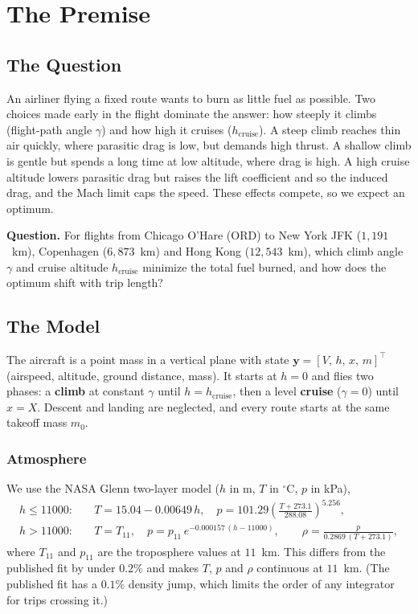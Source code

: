 
\section{The Premise}

\subsection{The Question}
An airliner flying a fixed route wants to burn as little fuel as possible. Two choices made
early in the flight dominate the answer: how steeply it climbs (flight-path angle $\gamma$)
and how high it cruises ($h_{\text{cruise}}$). A steep climb reaches thin air quickly, where
parasitic drag is low, but demands high thrust. A shallow climb is gentle but spends a long time
at low altitude, where drag is high. A high cruise altitude lowers parasitic drag but raises the
lift coefficient and so the induced drag, and the Mach limit caps the speed. These effects compete, so we
expect an optimum.

\textbf{Question.} For flights from Chicago O'Hare (ORD) to New York JFK ($1{,}191$~km),
Copenhagen ($6{,}873$~km) and Hong Kong ($12{,}543$~km), which climb angle $\gamma$ and cruise
altitude $h_{\text{cruise}}$ minimize the total fuel burned, and how does the optimum shift with
trip length?

\subsection{The Model}
The aircraft is a point mass in a vertical plane with state $\mathbf{y}=[V,\,h,\,x,\,m]^\top$
(airspeed, altitude, ground distance, mass). It starts at $h=0$ and flies two phases:
a \textbf{climb} at constant $\gamma$ until $h=h_{\text{cruise}}$, then a level \textbf{cruise}
($\gamma=0$) until $x=X$. Descent and landing are neglected, and every route starts at the same takeoff
mass $m_0$.

\subsubsection{Atmosphere}
We use the NASA Glenn two-layer model ($h$ in m, $T$ in $^\circ$C, $p$ in kPa),
\begin{align}
  h \le 11000: \quad & T = 15.04 - 0.00649\,h, \quad
     p = 101.29\left(\tfrac{T+273.1}{288.08}\right)^{5.256}, \\
  h > 11000: \quad & T = T_{11},\quad p = p_{11}\,e^{-0.000157\,(h-11000)}, \qquad
     \rho = \frac{p}{0.2869\,(T+273.1)},
\end{align}
where $T_{11}$ and $p_{11}$ are the troposphere values at $11$~km. This differs from the published
fit by under $0.2\%$ and makes $T$, $p$ and $\rho$ continuous at $11$~km. (The published fit has a $0.1\%$ density jump, which limits
the order of any integrator for trips crossing it.)

